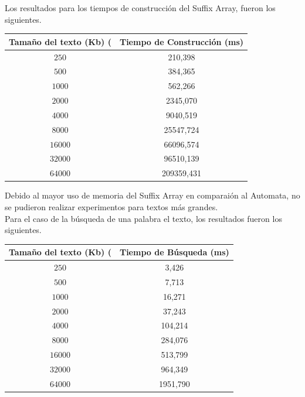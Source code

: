 \documentclass[letterpaper,10pt]{article}
\begin{document}
	Los resultados para los tiempos de construcción del Suffix Array, fueron los siguientes.

	\begin{center}
		\begin{tabular}{|c|c|}
			\hline
			Tamaño del texto (Kb) ( & Tiempo de Construcción (ms)\\
			\hline
			$250$ & 210,398\\
			\hline
			$500$ & 384,365\\
			\hline
			$1000$ & 562,266\\
			\hline
			$2000$ & 2345,070\\
			\hline
			$4000$ & 9040,519\\
			\hline
			$8000$ & 25547,724\\
			\hline
			$16000$ & 66096,574\\
			\hline
			$32000$ & 96510,139\\
			\hline
			$64000$ & 209359,431\\
			\hline
		\end{tabular}
	\end{center}
	
	Debido al mayor uso de memoria del Suffix Array en comparaión al Automata, no se pudieron realizar experimentos para textos más grandes.\\
	
	Para el caso de la búsqueda de una palabra el texto, los resultados fueron los siguientes.
	
	\begin{center}
		\begin{tabular}{|c|c|}
			\hline
			Tamaño del texto (Kb) ( & Tiempo de Búsqueda (ms)\\
			\hline
			$250$ & 3,426\\
			\hline
			$500$ & 7,713\\
			\hline
			$1000$ & 16,271\\
			\hline
			$2000$ & 37,243\\
			\hline
			$4000$ & 104,214\\
			\hline
			$8000$ & 284,076\\
			\hline
			$16000$ & 513,799\\
			\hline
			$32000$ & 964,349\\
			\hline
			$64000$ & 1951,790\\
			\hline
		\end{tabular}
	\end{center}
	
\end{document}
